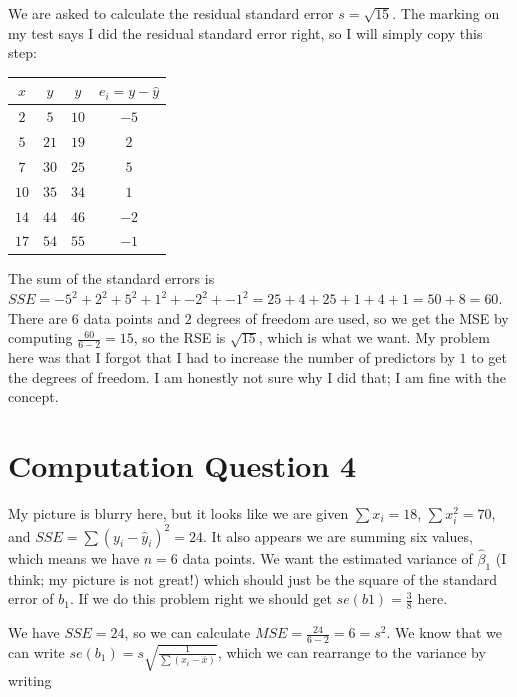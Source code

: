 \documentclass[12pt, letterpaper, parskip = full]{article}
\begin{document}
    We are asked to calculate the residual standard error \(s = \sqrt{15}\). The marking on my test says I did the residual standard error right, so I will simply copy this step:

    \begin{tabular}{|c|c|c|c|}
        \hline
        \(x\) & \(y\) & \(\hat{y}\) & \(e_i = y - \hat{y}\) \\
        \hline
        \(2\) & \(5\) & \(10\) & \(-5\) \\
        \hline
        \(5\) & \(21\) & \(19\) & \(2\) \\
        \hline
        \(7\) & \(30\) & \(25\) & \(5\) \\
        \hline
        \(10\) & \(35\) & \(34\) & \(1\) \\
        \hline
        \(14\) & \(44\) & \(46\) & \(-2\) \\
        \hline
        \(17\) & \(54\) & \(55\) & \(-1\) \\
        \hline    
    \end{tabular}

    The sum of the standard errors is \(SSE = -5^2 + 2^2 + 5^2 + 1^2 + -2^2 + -1^2 = 25 + 4 + 25 + 1 + 4 + 1 = 50 + 8 = 60\). There are \(6\) data points and \(2\) degrees of freedom are used, so we get the MSE by computing \(\frac{60}{6 - 2} = 15\), so the RSE is \(\sqrt{15}\), which is what we want. My problem here was that I forgot that I had to increase the number of predictors by \(1\) to get the degrees of freedom. I am honestly not sure why I did that; I am fine with the concept.

    \section{Computation Question 4}

    My picture is blurry here, but it looks like we are given \(\sum x_i = 18\), \(\sum x_i^2 = 70\), and \(SSE = \sum \left( y_i - \hat{y}_i \right)^2 = 24\). It also appears we are summing six values, which means we have \(n = 6\) data points. We want the estimated variance of \(\hat{\beta}_1\) (I think; my picture is not great!) which should just be the square of the standard error of \(b_1\). If we do this problem right we should get \(se(b1) = \frac{3}{8}\) here.

    We have \(SSE = 24\), so we can calculate \(MSE = \frac{24}{6 - 2} = 6 = s^2\). We know that we can write \(se(b_1) = s \sqrt{\frac{1}{\sum \left( x_i - \bar{x} \right)}}\), which we can rearrange to the variance by writing 
\end{document}
